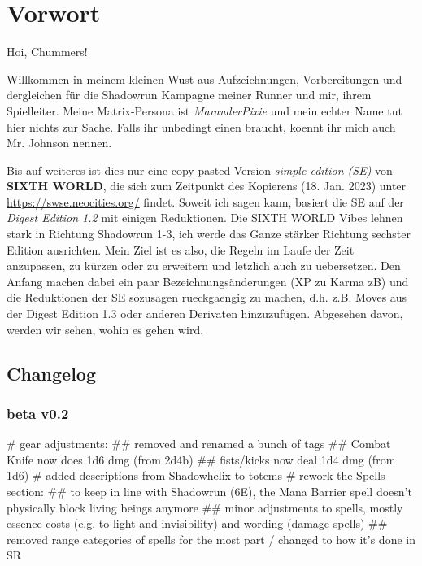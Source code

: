 \chapter{Vorwort}

Hoi, Chummers!

Willkommen in meinem kleinen Wust aus Aufzeichnungen, Vorbereitungen und dergleichen für die Shadowrun Kampagne meiner Runner und mir, ihrem Spielleiter. Meine Matrix-Persona ist \textit{MarauderPixie} und mein echter Name tut hier nichts zur Sache. Falls ihr unbedingt einen braucht, koennt ihr mich auch Mr. Johnson nennen.

Bis auf weiteres ist dies nur eine copy-pasted Version \textit{simple edition (SE)} von \textbf{SIXTH WORLD}, die sich zum Zeitpunkt des Kopierens (18. Jan. 2023) unter \url{https://swse.neocities.org/} findet. Soweit ich sagen kann, basiert die SE auf der \textit{Digest Edition 1.2} mit einigen Reduktionen. Die SIXTH WORLD Vibes lehnen stark in Richtung Shadowrun 1-3, ich werde das Ganze stärker Richtung sechster Edition ausrichten. Mein Ziel ist es also, die Regeln im Laufe der Zeit anzupassen, zu kürzen oder zu erweitern und letzlich auch zu uebersetzen. Den Anfang machen dabei ein paar Bezeichnungsänderungen (XP zu Karma zB) und die Reduktionen der SE sozusagen rueckgaengig zu machen, d.h. z.B. Moves aus der Digest Edition 1.3 oder anderen Derivaten hinzuzufügen. Abgesehen davon, werden wir sehen, wohin es gehen wird. 

\section{Changelog}

\subsection{beta v0.2}
\begin{easylist}
    # gear adjustments:
        ## removed and renamed a bunch of tags
        ## Combat Knife now does 1d6 dmg (from 2d4b)
        ## fists/kicks now deal 1d4 dmg (from 1d6)
    # added descriptions from Shadowhelix to totems 
    # rework the Spells section:
        ## to keep in line with Shadowrun (6E), the Mana Barrier spell doesn't physically block living beings anymore
        ## minor adjustments to spells, mostly essence costs (e.g. to light and invisibility) and wording (damage spells)
        ## removed range categories of spells for the most part / changed to how it's done in SR
\end{easylist}

